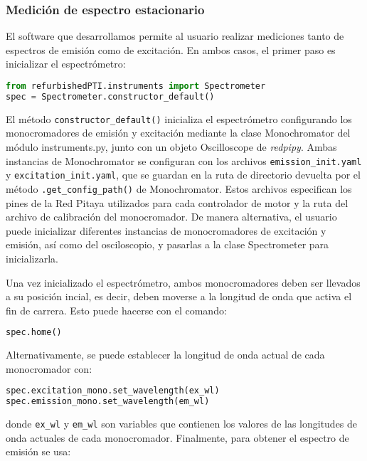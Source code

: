 \subsubsection{Medición de espectro estacionario} \label{sec:spec_mes}

El software que desarrollamos permite al usuario realizar mediciones tanto de espectros de emisión como de excitación. En ambos casos, el primer paso es inicializar el espectrómetro:

\begin{lstlisting}[language=Python]
from refurbishedPTI.instruments import Spectrometer
spec = Spectrometer.constructor_default()
\end{lstlisting}

\noindent El método \texttt{constructor\_default()} inicializa el espectrómetro configurando los monocromadores de emisión y excitación mediante la clase Monochromator del módulo instruments.py, junto con un objeto Oscilloscope de \textit{redpipy}.
Ambas instancias de Monochromator se configuran con los archivos \texttt{emission\_init.yaml} y \texttt{excitation\_init.yaml}, que se guardan en la ruta de directorio devuelta por el método \texttt{.get\_config\_path()} de Monochromator.
Estos archivos especifican los pines de la Red Pitaya utilizados para cada controlador de motor y la ruta del archivo de calibración del monocromador.
De manera alternativa, el usuario puede inicializar diferentes instancias de monocromadores de excitación y emisión, así como del osciloscopio, y pasarlas a la clase Spectrometer para inicializarla.

Una vez inicializado el espectrómetro, ambos monocromadores deben ser llevados a su posición incial, es decir, deben moverse a la longitud de onda que activa el fin de carrera. Esto puede hacerse con el comando:

\begin{lstlisting}[language=Python]
spec.home()
\end{lstlisting}

\noindent Alternativamente, se puede establecer la longitud de onda actual de cada monocromador con:

\begin{lstlisting}[language=Python]
spec.excitation_mono.set_wavelength(ex_wl)
spec.emission_mono.set_wavelength(em_wl)
\end{lstlisting}

\noindent donde \texttt{ex\_wl} y \texttt{em\_wl} son variables que contienen los valores de las longitudes de onda actuales de cada monocromador. 
Finalmente, para obtener el espectro de emisión se usa:

